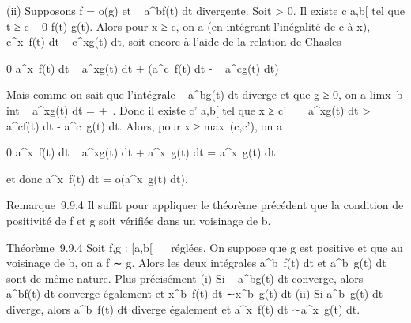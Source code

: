 (ii) Supposons f = o(g) et \int ~
a^bf(t) dt divergente. Soit \epsilon \textgreater{} 0. Il existe
c \in {[}a,b{[} tel que t ≥ c \rigtharrow~ 0 \leq f(t) \leq \epsilon {}
g(t). Alors pour x ≥ c, on a (en intégrant l'inégalité de c à x),
\int  c^x~f(t) dt \leq \epsilon
{} \int ~
c^xg(t) dt, soit encore à l'aide de la relation de
Chasles

0 \leq\int  a^x~f(t) dt \leq \epsilon
{} \int ~
a^xg(t) dt + \left
(\int  a^c~f(t) dt - \epsilon
{} \int ~
a^cg(t) dt\right )

Mais comme on sait que l'intégrale \int ~
a^bg(t) dt diverge et que g ≥ 0, on a
limx\rightarrow~b\\int ~
a^xg(t) dt = +\infty~. Donc il existe c' \in {[}a,b{[} tel que x
≥ c' \rigtharrow~ \epsilon {} \int ~
a^xg(t) dt \textgreater{}\int ~
a^cf(t) dt - \epsilon {}
\int  a^c~g(t) dt. Alors, pour x
≥ max~(c,c'), on a

0 \leq\int  a^x~f(t) dt \leq \epsilon
{} \int ~
a^xg(t) dt + \epsilon {}
\int  a^x~g(t) dt =
\epsilon\int  a^x~g(t) dt

et donc \int  a^x~f(t) dt =
o(\int  a^x~g(t) dt).

Remarque~9.9.4 Il suffit pour appliquer le théorème précédent que la
condition de positivité de f et g soit vérifiée dans un voisinage de b.

Théorème~9.9.4 Soit f,g : {[}a,b{[}\rightarrow~ ~ réglées. On suppose que g est
positive et que au voisinage de b, on a f ∼ g. Alors les deux intégrales
\int  a^b~f(t) dt et
\int  a^b~g(t) dt sont de même
nature. Plus précisément (i) Si \int ~
a^bg(t) dt converge, alors \int ~
a^bf(t) dt converge également et
\int  x^b~f(t) dt
∼\int  x^b~g(t) dt (ii) Si
\int  a^b~g(t) dt diverge, alors
\int  a^b~f(t) dt diverge
également et \int  a^x~f(t) dt
∼\int  a^x~g(t) dt.

